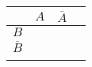 \begin{tabular}{c | c | c | c }
               & $A$ & $\overline{A}$ & \\
\hline
$B$            &     &                & \\
\hline
$\overline{B}$ &     &                & \\
\hline
               &     &                & \\
\end{tabular}
